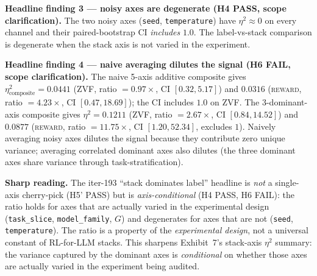 \documentclass{article}  \usepackage[preprint,nonatbib]{neurips_2026} \usepackage[numbers]{natbib}
\begin{document}
\textbf{Headline finding 3 --- noisy axes are degenerate (H4 PASS,
scope clarification).} The two noisy axes (\texttt{seed},
\texttt{temperature}) have $\eta^2 \approx 0$ on every channel and their
paired-bootstrap CI \emph{includes} $1.0$. The label-vs-stack comparison
is degenerate when the stack axis is not varied in the experiment.

\textbf{Headline finding 4 --- naive averaging dilutes the signal (H6
FAIL, scope clarification).} The naive 5-axis additive composite gives
$\eta^2_\text{composite} = 0.0441$ (\textsc{ZVF}, ratio $=0.97\times$,
CI $[0.32, 5.17]$) and $0.0316$ (\textsc{reward}, ratio $=4.23\times$,
CI $[0.47, 18.69]$); the CI includes $1.0$ on \textsc{ZVF}. The 3-dominant-axis composite gives $\eta^2 = 0.1211$ (\textsc{ZVF}, ratio
$=2.67\times$, CI $[0.84, 14.52]$) and $0.0877$ (\textsc{reward},
ratio $=11.75\times$, CI $[1.20, 52.34]$, excludes $1$). Naively
averaging noisy axes dilutes the signal because they contribute zero
unique variance; averaging correlated dominant axes also dilutes (the
three dominant axes share variance through task-stratification).

\textbf{Sharp reading.} The iter-193 ``stack dominates label''
headline is \emph{not} a single-axis cherry-pick (H5' PASS) but is
\emph{axis-conditional} (H4 PASS, H6 FAIL): the ratio holds for axes that
are actually varied in the experimental design (\texttt{task\_slice},
\texttt{model\_family}, $G$) and degenerates for axes that are not
(\texttt{seed}, \texttt{temperature}). The ratio is a property of the
\emph{experimental design}, not a universal constant of RL-for-LLM
stacks. This sharpens Exhibit~7's stack-axis $\eta^2$ summary: the
variance captured by the dominant axes is \emph{conditional} on whether
those axes are actually varied in the experiment being audited.
\end{document}
